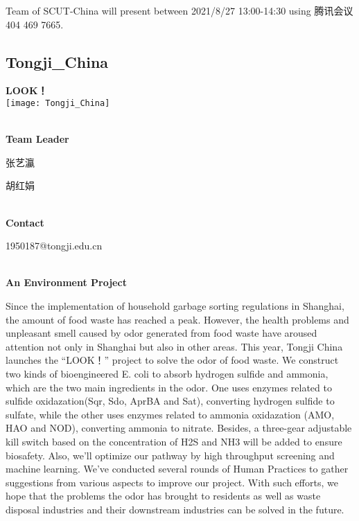 Team of SCUT-China will present between 2021/8/27 13:00-14:30        using 腾讯会议 404 469 7665.
\newpage


\subsection{\textcolor{Blu}{ Tongji\_China } }
\vspace{5mm}
\begin{center}
\large{
  \textbf{ LOOK！ }\\
  \texttt{[image: Tongji\_China]}
}
\end{center}
\textbf{\\Team Leader}

  张艺瀛

  胡红娟


\textbf{\\Contact}

  1950187@tongji.edu.cn


\textbf{\\An Environment Project\\}\begin{spacing}{1.5}

Since the implementation of household garbage sorting regulations in Shanghai, the amount of food waste has reached a peak. However, the health problems and unpleasant smell caused by odor generated from food waste have aroused attention not only in Shanghai but also in other areas. This year, Tongji China launches the “LOOK！” project to solve the odor of food waste. We construct two kinds of bioengineered E. coli to absorb hydrogen sulfide and ammonia, which are the two main ingredients in the odor. One uses enzymes related to sulfide oxidazation(Sqr, Sdo, AprBA and Sat), converting hydrogen sulfide to sulfate, while the other uses enzymes related to ammonia oxidazation (AMO, HAO and NOD), converting ammonia to nitrate. Besides, a three-gear adjustable kill switch based on the concentration of H2S and NH3 will be added to ensure biosafety. Also, we’ll optimize our pathway by high throughput screening and machine learning. We’ve conducted several rounds of Human Practices to gather suggestions from various aspects to improve our project. With such efforts, we hope that the problems the odor has brought to residents as well as waste disposal industries and their downstream industries can be solved in the future.\end{spacing}
\\

